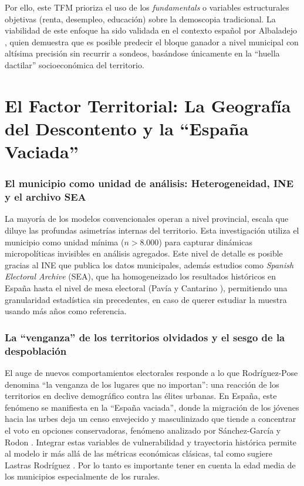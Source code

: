 Por ello, este TFM prioriza el uso de los \textit{fundamentals} o variables estructurales objetivas (renta, desempleo, educación) sobre la demoscopia tradicional. La viabilidad de este enfoque ha sido validada en el contexto español por Albaladejo \cite{albaladejo2025}, quien demuestra que es posible predecir el bloque ganador a nivel municipal con altísima precisión sin recurrir a sondeos, basándose únicamente en la ``huella dactilar'' socioeconómica del territorio.

\section{El Factor Territorial: La Geografía del Descontento y la ``España Vaciada''}

\subsubsection{El municipio como unidad de análisis: Heterogeneidad, INE y el archivo SEA}
La mayoría de los modelos convencionales operan a nivel provincial, escala que diluye las profundas asimetrías internas del territorio. Esta investigación utiliza el municipio como unidad mínima ($n > 8.000$) para capturar dinámicas micropolíticas invisibles en análisis agregados. Este nivel de detalle es posible gracias al INE que publica los datos municipales, además estudios como \textit{Spanish Electoral Archive} (SEA), que ha homogeneizado los resultados históricos en España hasta el nivel de mesa electoral (Pavía y Cantarino \cite{pavia2021}), permitiendo una granularidad estadística sin precedentes, en caso de querer estudiar la muestra usando más años como referencia.

\subsubsection{La ``venganza'' de los territorios olvidados y el sesgo de la despoblación}
El auge de nuevos comportamientos electorales responde a lo que Rodríguez-Pose \cite{rodriguezpose2018} denomina ``la venganza de los lugares que no importan'': una reacción de los territorios en declive demográfico contra las élites urbanas. En España, este fenómeno se manifiesta en la ``España vaciada'', donde la migración de los jóvenes hacia las urbes deja un censo envejecido y masculinizado que tiende a concentrar el voto en opciones conservadoras, fenómeno analizado por Sánchez-García y Rodon \cite{sanchez2023}. Integrar estas variables de vulnerabilidad y trayectoria histórica permite al modelo ir más allá de las métricas económicas clásicas, tal como sugiere Lastras Rodríguez \cite{lastras2024}. Por lo tanto es importante tener en cuenta la edad media de los municipios especialmente de los rurales.

